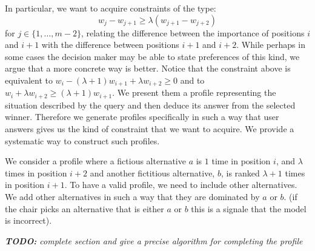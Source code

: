 In particular, we want to acquire constraints of the type:
\[ w_{j} - w_{j+1} \geq \lambda (w_{j+1} - w_{j+2}) \] 
for $j \in \{1,\ldots,m-2\}$, relating the difference between the importance of positions $i$ and $i+1$ with the difference between positions $i+1$ and $i+2$.
While perhaps in some cases the decision maker may be able to state preferences of this kind, we argue that a more concrete way is better.
Notice that the constraint above is equivalent to 
$w_{i} - (\lambda+1) w_{i+1} + \lambda w_{i+2} \geq 0$
and to $w_{i} + \lambda w_{i+2} \geq  (\lambda+1) w_{i+1}$.
We present them a profile representing the situation described by the query and then deduce its answer from the selected winner. 
Therefore we generate profiles specifically in such a way that user answers gives us the kind of constraint that we want to acquire.
We provide a systematic way to construct such profiles.  %

We consider a profile where a fictious alternative $a$ is $1$ time in position $i$, and $\lambda$ times 
in position $i+2$ and another fictitious alternative, $b$, is ranked $\lambda+1$ times in position $i+1$.
To have a valid profile, we need to include other alternatives.
We add other alternatives in such a way that they are dominated by $a$ or $b$. 
(if the chair picks an alternative that is either $a$ or $b$ this is a signale that the model is incorrect).

\vspace{1cm}
{\em {\bf TODO:} complete section and give a precise algorithm for completing the profile}
\vspace{1cm}

